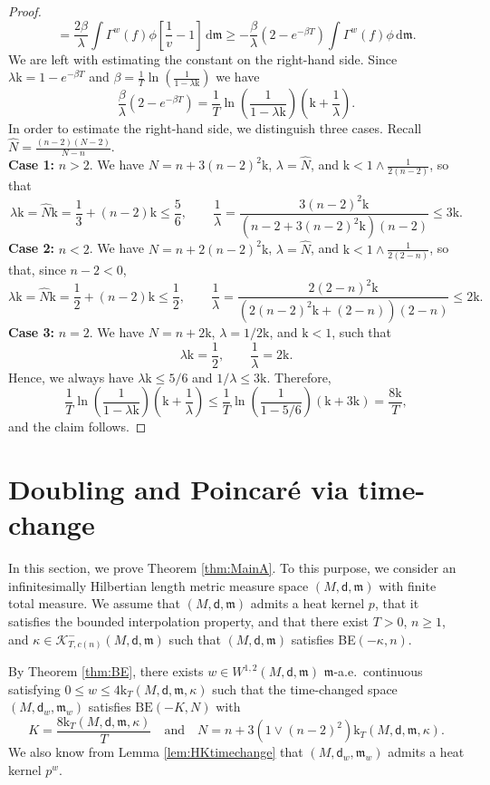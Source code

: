 \documentclass[10pt]{article}
\newcommand{\K}{\mathscr{K}}
\newcommand{\m}{\mathfrak{m}}
\newcommand{\M}{{\mathit{M}}}
\renewcommand{\d}{\,\mathrm{d}}
\renewcommand{\k}{\mathrm{k}}
\newcommand{\dist}{\mathsf{d}}
\theoremstyle{plain}
\theoremstyle{definition}
\newcommand{\Sob}{W^{1,2}(M,\dist,\m)}
\begin{document}
\begin{proof}
\[=
\frac{2\beta}\lambda\int \Gamma^w(f)\phi\left[\frac{1}v-1\right]\d \m
\geq -\frac{\beta}\lambda (2-e^{-\beta T})
\int \Gamma^w(f)\phi\d \m.
\]
We are left with estimating the constant on the right-hand side. 
Since  $\lambda \k=1-e^{-\beta T}$ and $\beta= \frac{1}T\ln\left(\frac1{1-\lambda\k} \right)$ we have
\[
\frac{\beta}\lambda (2-e^{-\beta T})
= \frac{1}T\ln\left(\frac1{1-\lambda\k} \right)\left(\k+\frac{1}{\lambda}\right).
\]
In order to estimate the right-hand side, we  distinguish three cases. Recall $\hat N=\tfrac{(n-2)(N-2)}{N-n}$.
\\
\textbf{Case 1:} $n>2$. We have $N=n+3(n-2)^2\k$, $\lambda=\hat N$, and $\k< 1\wedge \tfrac{1}{2(n-2)}$, so that 
\[
\lambda \k=\hat N\k
=
\frac{1}{3}+(n-2)\k\leq \frac{5}{6},\qquad \frac{1}{\lambda}=\frac{3(n-2)^2\k}{(n-2+3(n-2)^2\k)(n-2)}\le 3\k.
\]
\textbf{Case 2:} $n<2$. We have $N=n+2(n-2)^2\k$, $\lambda=\hat N$, and $\k<1\wedge \tfrac{1}{2(2-n)}$, so that, since $n-2<0$,
\[
\lambda \k=\hat N\k
=
\frac{1}{2}+(n-2)\k\leq \frac{1}{2},\qquad \frac{1}{\lambda}=\frac{2(2-n)^2\k}{(2(n-2)^2\k+(2-n))(2-n)}\le 2\k.
\]
\textbf{Case 3:} $n=2$. We have $N=n+2\k$, $\lambda=1/2\k$, and $\k< 1$, such that
\[
\lambda \k=\frac{1}{2},
\qquad \frac{1}{\lambda}= 2\k.
\]
Hence, we always have $\lambda\k\leq 5/6$ and $1/\lambda\leq 3\k$. Therefore,
\[
 \frac{1}T\ln\left(\frac1{1-\lambda\k} \right)\left(\k+\frac{1}{\lambda}\right)
\leq 
\frac{1}T\ln\left(\frac1{1-5/6} \right)\left(\k+3\k\right)
=\frac{8\k}{T},
\]
and the claim follows.
\end{proof}












\section{Doubling and Poincaré via time-change}

In this section, we prove Theorem \ref{thm:MainA}. To this purpose, we  consider an infinitesimally Hilbertian length  metric measure space $(\M,\dist,\m)$ with finite total measure. We assume that $(\M,\dist,\m)$ admits a heat kernel $p$, that it satisfies the bounded interpolation property, and that there exist $T>0$, $n \ge 1$, and $\kappa \in \K^-_{T,c(n)}(\M,\dist,\m)$ such that $(M,\dist,\m)$ satisfies BE$(-\kappa,n)$.

By Theorem \ref{thm:BE}, there exists $w \in \Sob$ $\m$-a.e.~continuous satisfying $0 \le w \le 4 \k_T(M,\dist,\m,\kappa)$ such that the time-changed space $(M,\dist_w,\m_w)$ satisfies $\mathrm{BE}(-K,N)$ with \[K=\frac{8\k_T(M,\dist,\m,\kappa)}{T}\quad \text{and} \quad  N=n+3(1\vee (n-2)^2) \k_T(M,\dist,\m,\kappa).\] We also know from Lemma \ref{lem:HKtimechange} that $(M,\dist_w,\m_w)$ admits a heat kernel $p^w$.
 
\end{document}
